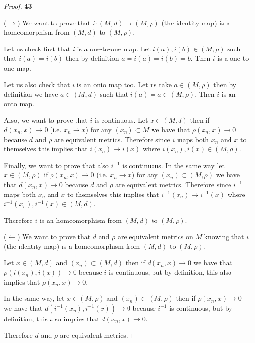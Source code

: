 \documentclass[11pt]{article}
\theoremstyle{definition}
\begin{document}
    \begin{proof}{\textbf{43}}

        ($\rightarrow$) We want to prove that $i:(M,d) \to (M,\rho)$ (the
        identity map) is a homeomorphism from $(M,d)$ to $(M, \rho)$.

        Let us check first that $i$ is a one-to-one map. Let
        $i(a),i(b) \in (M,\rho)$ such that $i(a) = i(b)$ then by definition
        $a = i(a) = i(b) = b$. Then $i$ is a one-to-one map.

        Let us also check that $i$ is an onto map too. Let us take
        $a \in (M, \rho)$ then by definition we have $a \in (M,d)$ such that
        $i(a) = a \in (M, \rho)$. Then $i$ is an onto map.

        Also, we want to prove that $i$ is continuous. Let $x \in (M,d)$ then
        if $d(x_n, x) \to 0$ (i.e. $x_n \to x$) for any $(x_n) \subset M$ we
        have that $\rho(x_n, x) \to 0$ because $d$ and $\rho$ are equivalent
        metrics. Therefore since $i$ maps both $x_n$ and $x$ to themselves this
        implies that $i(x_n) \to i(x)$ where $i(x_n), i(x) \in (M, \rho)$.
        
        Finally, we want to prove that also $i^{-1}$ is continuous. In the same
        way let $x \in (M,\rho)$ if $\rho(x_n, x) \to 0$ (i.e. $x_n \to x$)
        for any $(x_n) \subset (M, \rho)$ we have that $d(x_n, x) \to 0$
        because $d$ and $\rho$ are equivalent metrics. Therefore since $i^{-1}$
        maps both $x_n$ and $x$ to themselves this implies that
        $i^{-1}(x_n) \to i^{-1}(x)$ where $i^{-1}(x_n), i^{-1}(x) \in (M, d)$.

        Therefore $i$ is an homeomorphism from $(M,d)$ to $(M, \rho)$.

        ($\leftarrow$) We want to prove that $d$ and $\rho$ are equivalent
        metrics on $M$ knowing that $i$ (the identity map) is a homeomorphism
        from $(M,d)$ to $(M,\rho)$.

        Let $x \in (M,d)$ and $(x_n) \subset (M,d)$ then if $d(x_n,x) \to 0$ we
        have that $\rho(i(x_n), i(x)) \to 0$ because $i$ is continuous, but by
        definition, this also implies that $\rho(x_n, x) \to 0$.

        In the same way, let $x \in (M,\rho)$ and $(x_n) \subset (M,\rho)$ then
        if $\rho(x_n,x) \to 0$ we have that $d(i^{-1}(x_n), i^{-1}(x)) \to 0$
        because $i^{-1}$ is continuous, but by definition, this also implies
        that $d(x_n, x) \to 0$.

        Therefore $d$ and $\rho$ are equivalent metrics.
    \end{proof}
\end{document}
